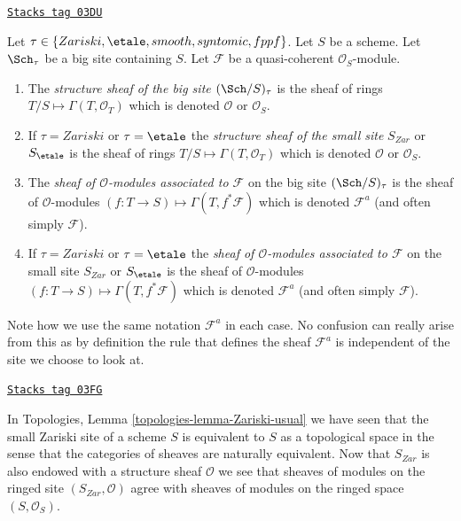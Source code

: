 \begin{definition}
\label{descent-definition-structure-sheaf}
\href{https://stacks.math.columbia.edu/tag/03DU}{\texttt{Stacks tag 03DU}}

Let $\tau \in \{Zariski, \linebreak[0] \etale, \linebreak[0]
smooth, \linebreak[0] syntomic, \linebreak[0] fppf\}$.
Let $S$ be a scheme.
Let $\Sch_\tau$ be a big site containing $S$.
Let $\mathcal{F}$ be a quasi-coherent $\mathcal{O}_S$-module.
\begin{enumerate}
\item The {\it structure sheaf of the big site $(\Sch/S)_\tau$}
is the sheaf of rings $T/S \mapsto \Gamma(T, \mathcal{O}_T)$ which is
denoted $\mathcal{O}$ or $\mathcal{O}_S$.
\item If $\tau = Zariski$ or $\tau = \etale$ the
{\it structure sheaf of the small site} $S_{Zar}$ or $S_\etale$
is the sheaf of rings $T/S \mapsto \Gamma(T, \mathcal{O}_T)$
which is denoted $\mathcal{O}$ or $\mathcal{O}_S$.
\item The {\it sheaf of $\mathcal{O}$-modules associated to
$\mathcal{F}$} on the big site $(\Sch/S)_\tau$
is the sheaf of $\mathcal{O}$-modules
$(f : T \to S) \mapsto \Gamma(T, f^*\mathcal{F})$
which is denoted $\mathcal{F}^a$ (and often simply $\mathcal{F}$).
\item If $\tau = Zariski$ or $\tau = \etale$ the
{\it sheaf of $\mathcal{O}$-modules associated to $\mathcal{F}$}
on the small site $S_{Zar}$ or $S_\etale$ is the sheaf of
$\mathcal{O}$-modules $(f : T \to S) \mapsto \Gamma(T, f^*\mathcal{F})$
which is denoted $\mathcal{F}^a$ (and often simply $\mathcal{F}$).
\end{enumerate}
\end{definition}

Note how we use the same notation $\mathcal{F}^a$ in each case.
No confusion can really arise from this as by definition the rule
that defines the sheaf $\mathcal{F}^a$ is independent of the site
we choose to look at.

\begin{remark}
\label{descent-remark-Zariski-site-space}
\href{https://stacks.math.columbia.edu/tag/03FG}{\texttt{Stacks tag 03FG}}

In Topologies, Lemma \ref{topologies-lemma-Zariski-usual}
we have seen that the small Zariski site of a scheme $S$ is
equivalent to $S$ as a topological space in the sense that the
categories of sheaves are naturally equivalent. Now that $S_{Zar}$
is also endowed with a structure sheaf $\mathcal{O}$ we see
that sheaves of modules on the ringed site $(S_{Zar}, \mathcal{O})$
agree with sheaves of modules on the ringed space $(S, \mathcal{O}_S)$.
\end{remark}

